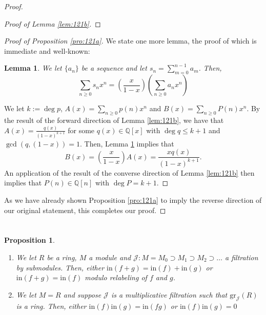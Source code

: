 \documentclass[english]{article}
\newcommand{\QQ}{\mathbb{Q}}
\newcommand{\Jcal}{\mathcal{J}}
\newenvironment{subproof}[1][\proofname]{%
	\renewcommand{\qedsymbol}{$\blacksquare$}%
	\begin{proof}[#1]%
	}{%
	\end{proof}%
}
\newcommand{\prob}[1]{\setcounter{section}{#1-1}\section{}}
\newtheorem{lemma}[theorem]{Lemma}
\newtheorem*{prop*}{Proposition}
\theoremstyle{remark}
\theoremstyle{definition}
\newcommand{\gr}{\mathrm{gr}}
\newcommand{\ins}{\mathrm{in}}
\begin{document}
\begin{proof}
\begin{subproof}[Proof of Lemma \ref{lem:121b}]
\end{subproof}
\begin{subproof}[Proof of Proposition \ref{pro:121a}]
	We state one more lemma, the proof of which is immediate and well-known:
	\begin{lemma}
		\label{lem:121c} We let $\{a_n\}$ be a sequence and let $s_n=\sum_{m=0}^{n-1}a_m$. Then, $$\sum_{n\geq 0}s_nx^n=\left(\frac{x}{1-x}\right)\left(\sum_{n\geq 0}a_nx^n\right)$$
	\end{lemma}
	
 We let $k:=\deg p$, $A(x)=\sum_{n\geq 0} p(n)x^n$ and $B(x)=\sum_{n\geq 0}P(n)x^n$. By the result of the forward direction of Lemma \ref{lem:121b}, we have that $A(x)=\frac{q(x)}{(1-x)^{k+1}}$ for some $q(x)\in \QQ[x]$ with $\deg q\leq k+1$ and $\gcd(q,(1-x))=1$. Then, Lemma \ref{lem:121c} implies that $$B(x)=\left(\frac{x}{1-x}\right)A(x)=\frac{xq(x)}{(1-x)^{k+1}}.$$ An application of the result of the converse direction of Lemma \ref{lem:121b} then implies that $P(n)\in \QQ[n]$ with $\deg P=k+1$. 
\end{subproof}
As we have already shown Proposition \ref{pro:121a} to imply the reverse direction of our original statement, this completes our proof.
\end{proof}
\prob{19}\begin{prop*}\begin{enumerate}[label=\emph{(\roman*)}]
	\item We let $R$ be a ring, $M$ a module and $\Jcal: M=M_0\supset M_1\supset M_2\supset\hdots$ a filtration by submodules. Then, either $\ins(f+g)=\ins(f)+\ins(g)$ or $\ins(f+g)=\ins(f)$ modulo relabeling of $f$ and $g$.
\item We let $M=R$ and suppose $\Jcal$ is a multiplicative filtration such that $\gr_\Jcal(R)$ is a ring. Then, either $\ins(f)\ins(g)=\ins(fg)$ or $\ins(f)\ins(g)=0$\end{enumerate}
\end{prop*}
\end{document}
